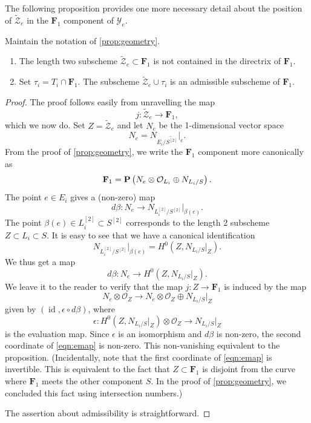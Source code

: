 \documentclass[reqno]{amsart}
\DeclareMathOperator{\id}{id}
\renewcommand{\to}{{\longrightarrow}}
\renewcommand {\P}{{\bf P}}
\numberwithin{equation}{section}
\renewcommand{\O}{\mathcal{O}}
\newcommand{\F}{\mathbf{F}}
\newcommand{\td}{\widetilde}
\begin{document}
The following proposition provides one more necessary detail about the position of $\widetilde {\mathcal{Z}}_e$ in the $\F_1$ component of $\mathcal{Y}_e$.
\begin{proposition}
  \label{prop:nodirectrix}
  Maintain the notation of \autoref{prop:geometry}.
  \begin{enumerate}
  \item The length two
    subscheme $\td{\mathcal{Z}}_{e} \subset \F_{1}$ is not contained in the directrix of $\F_{1}$.
  \item Set $\tau_i = T_i \cap \F_1$.
    The subscheme $\td{\mathcal{Z}}_e \cup \tau_i$ is an admissible subscheme of $\F_1$.
  \end{enumerate}
\end{proposition}
\begin{proof}
  The proof follows easily from unravelling the map
  \[ j \colon \widetilde {\mathcal{Z}}_e \to \F_1,\]
  which we now do.
  Set $Z = \widetilde{\mathcal{Z}}_e$ and let $N_e$ be the 1-dimensional vector space
  \[ N_e = N_{E_i/\widetilde{S^{[2]}}} \big|_e. \]
  From the proof of \autoref{prop:geometry}, we write the $\F_1$ component more canonically as
  \[
    \F_1 = \P\left(N_e \otimes \O_{L_i} \oplus N_{L_i/S}\right).
  \]
  The point $e \in E_i$ gives a (non-zero) map
  \[
    d \beta \colon N_e \to N_{L^{[2]}_i / S^{[2]}}|_{\beta(e)}.
  \]
  The point $\beta(e) \in L^{[2]}_i \subset S^{[2]}$ corresponds to the length 2 subscheme $Z \subset L_i \subset S$.
  It is easy to see that we have a canonical identification
  \[
    N_{L^{[2]}_i / S^{[2]}}\big |_{\beta(e)} = H^0\left(Z, N_{L_i/S}|_Z\right).
  \]
  We thus get a map
  \[
    d \beta \colon N_e \to H^0\left(Z, N_{L_i/S}|_Z\right).
  \]
  We leave it to the reader to verify that the map $j \colon Z \to \F_1$ is induced by the map
  \begin{equation}\label{eqn:emap}
    N_e \otimes \O_Z \to N_e \otimes \O_Z \oplus N_{L_i/S}|_Z
  \end{equation}
  given by $(\id, \epsilon \circ d\beta)$, where
  \[
    \epsilon \colon H^0\left(Z, N_{L_i/S}|_Z\right) \otimes \O_Z \to N_{L_i/S}|_Z
  \]
  is the evaluation map.
  Since $\epsilon$ is an isomorphism and $d \beta$ is non-zero, the second coordinate of \eqref{eqn:emap} is non-zero.
  This non-vanishing equivalent to the proposition.
  (Incidentally, note that the first coordinate of \eqref{eqn:emap} is invertible.
  This is equivalent to the fact that $Z \subset \F_1$ is disjoint from the curve where $\F_1$ meets the other component $S$.
  In the proof of \autoref{prop:geometry}, we concluded this fact using intersection numbers.)

  The assertion about admissibility is straightforward.
\end{proof}
\end{document}
